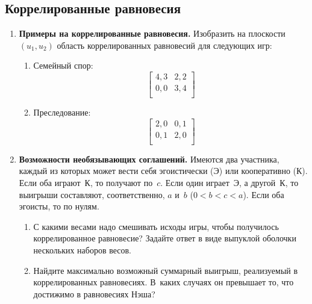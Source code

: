 \documentclass[a4paper,12pt]{article}
\begin{document}
\subsection{Коррелированные равновесия}

\begin{enumerate}

\item {\bf Примеры на коррелированные равновесия.}
Изобразить на плоскости $(u_1,u_2)$ область коррелированных
равновесий для следующих игр:

\begin{enumerate}

\item Семейный спор:
\[\left[\begin{array}{ll}
4,3&2,2\\ 0,0&3,4\\
\end{array}\right]\]

\item Преследование:
\[\left[\begin{array}{ll}
2,0&0,1\\ 0,1&2,0\\
\end{array}\right]\]

\end{enumerate}

\item {\bf Возможности необязывающих соглашений.} Имеются
два участника, каждый из которых может вести себя
эгоистически ($Э$) или кооперативно ($К$). Если оба
играют~$К$, то получают по~$c$. Если один играет~$Э$, а
другой~$К$, то выигрыши составляют, соответственно, $a$
и~$b$ (${0<b<c<a}$). Если оба эгоисты, то по нулям.

\begin{enumerate}

\item С какими весами надо смешивать исходы игры, чтобы
получилось коррелированное равновесие? Задайте ответ в виде
выпуклой оболочки нескольких наборов весов.

\item Найдите максимально возможный суммарный выигрыш,
реализуемый в коррелированных равновесиях. В~каких случаях
он превышает то, что достижимо в равновесиях Нэша?

\end{enumerate}

\end{enumerate}
\end{document}
